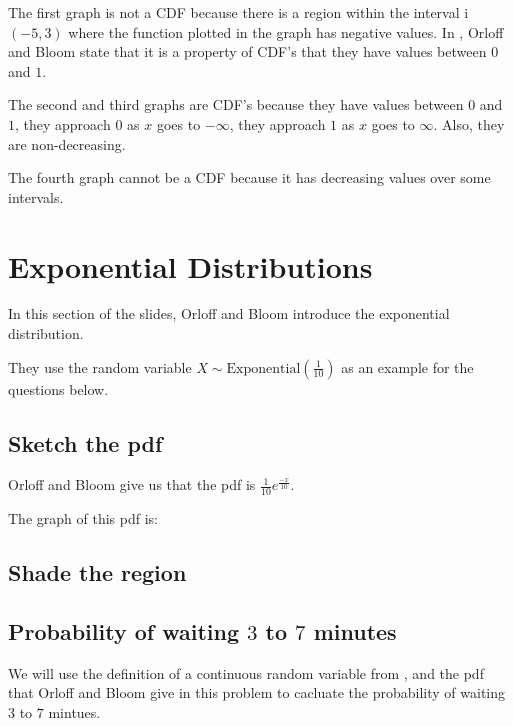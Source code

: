 \documentclass[a4paper,11pt]{article}
\begin{document}
The first graph is not a CDF because there is a region within the interval
i$\left( -5, 3 \right)$ where the function plotted in the graph has negative
values.  In \cite{reading5b}, Orloff and Bloom state that it is
a property of CDF's that they have values between $0$ and $1$.

The second and third graphs are CDF's because they have values between $0$ and
$1$, they approach $0$ as $x$ goes to $-\infty$, they approach $1$ as $x$ goes
to $\infty$. Also, they are non-decreasing.

The fourth graph cannot be a CDF because it has decreasing values over some
intervals.



\section{Exponential Distributions}

In this section of the slides, Orloff and Bloom introduce the exponential
distribution.

They use the random variable
$X \sim \text{Exponential}\left( \frac{1}{10} \right)$ as an example
for the questions below.

\subsection{Sketch the pdf}

Orloff and Bloom give us that the pdf is $\frac{1}{10}e^{\frac{-x}{10}}$.

The graph of this pdf is:


\subsection{Shade the region}

\subsection{Probability of waiting $3$ to $7$ minutes}
We will use the definition of a continuous random variable
from \cite{reading5b}, and the pdf that Orloff and Bloom give
in this problem to cacluate the probability of waiting $3$
to $7$ mintues.
\end{document}
